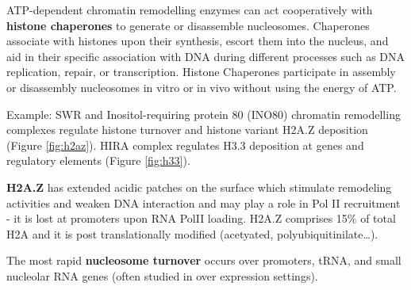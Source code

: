 ATP-dependent chromatin remodelling enzymes can act cooperatively with \textbf{histone chaperones} to generate or disassemble nucleosomes. Chaperones associate with histones upon their synthesis, escort them into the nucleus, and aid in their specific association with DNA during different processes such as DNA replication, repair, or transcription. Histone Chaperones participate in assembly or disassembly nucleosomes in vitro or in vivo without using the energy of ATP.

Example: SWR and Inositol-requiring protein 80 (INO80) chromatin remodelling complexes regulate histone turnover and histone variant H2A.Z deposition (Figure \ref{fig:h2az}). HIRA complex regulates H3.3 deposition at genes and regulatory elements (Figure \ref{fig:h33}).

\textbf{H2A.Z} has extended acidic patches on the surface which stimulate remodeling activities and weaken DNA interaction and may play a role in Pol II recruitment - it is lost at promoters upon RNA PolII loading. H2A.Z comprises 15\% of total H2A and it is post translationally modified (acetyated, polyubiquitinilate\ldots).

The most rapid \textbf{nucleosome turnover} occurs over promoters, tRNA, and small nucleolar RNA genes (often studied in over expression settings).

